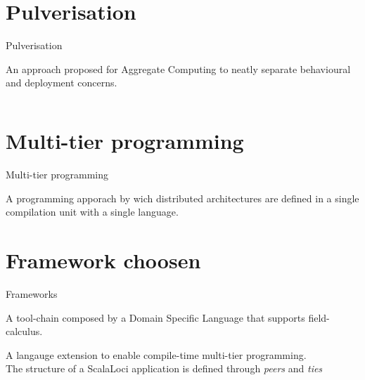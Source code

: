 \documentclass[aspectratio=169]{beamer}
\begin{document}
\section{Pulverisation}
\begin{frame}{Pulverisation~\cite{DBLP:journals/fi/CasadeiPPVW20}}

{
    \begin{cardTiny}
      {
        \color{accent} An approach proposed for Aggregate Computing 
        to neatly separate behavioural and deployment concerns. 
      }
    \end{cardTiny}
    \begin{columns}
      \begin{column}{0.45\textwidth}
      \end{column}
      \begin{column}{0.38\textwidth}
      \end{column}
    \end{columns}
}
\end{frame}

\section{Multi-tier programming}

\begin{frame}{Multi-tier programming~\cite{DBLP:journals/csur/WeisenburgerWS20}}
  \begin{cardTiny}
  {
    \color{accent} A programming apporach by wich distributed architectures 
    are defined in a single compilation unit with a single language. 
  }
  \end{cardTiny}
  \centering
\end{frame}

\section{Framework choosen}
\begin{frame}{Frameworks}%

{
  \begin{card}
    A tool-chain composed by a Domain Specific Language that supports field-calculus.
  \end{card}
  \pause
  \begin{card}
    A langauge extension to enable compile-time multi-tier programming.\\
    The  structure  of  a ScalaLoci application is defined through \textit{peers} and \textit{ties}
  \end{card}
}
\end{frame}
\end{document}
